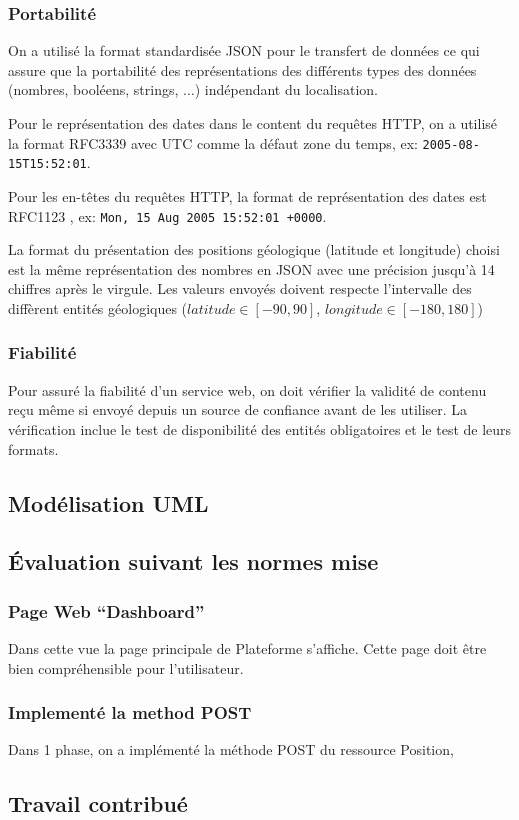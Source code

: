 \subsubsection{Portabilité}

On a utilisé la format standardisée JSON pour le transfert de données ce qui
assure que la portabilité des représentations des différents types des données
(nombres, booléens, strings, $\dotsc$) indépendant du localisation.

Pour le représentation des dates dans le content du requêtes HTTP, on a utilisé
la format RFC3339 \cite{RFC3339} avec UTC comme la défaut zone du temps, ex:
\verb|2005-08-15T15:52:01|.

Pour les en-têtes du requêtes HTTP, la format de représentation des dates est
RFC1123 \cite{RFC1123}, ex: \verb|Mon, 15 Aug 2005 15:52:01 +0000|.

La format du présentation des positions géologique (latitude et longitude)
choisi est la même représentation des nombres en JSON avec une précision jusqu'à
14 chiffres après le virgule. Les valeurs envoyés doivent respecte l'intervalle
des diffèrent entités géologiques ($latitude \in [-90, 90]$,
$longitude \in [-180, 180]$)

\subsubsection{Fiabilité}

Pour assuré la fiabilité d'un service web, on doit vérifier la validité de
contenu reçu même si envoyé depuis un source de confiance avant de les
utiliser. La vérification inclue le test de disponibilité des entités
obligatoires et le test de leurs formats.


\subsection{Modélisation UML}
\subsection{Évaluation suivant les normes mise}
\subsubsection{Page Web ``Dashboard''}
Dans cette vue la page principale de Plateforme s'affiche. Cette page doit être
bien compréhensible pour l'utilisateur.


\subsubsection{Implementé la method POST}

Dans 1\ier{} phase, on a implémenté la méthode POST du ressource Position,


\subsection{Travail contribué}


